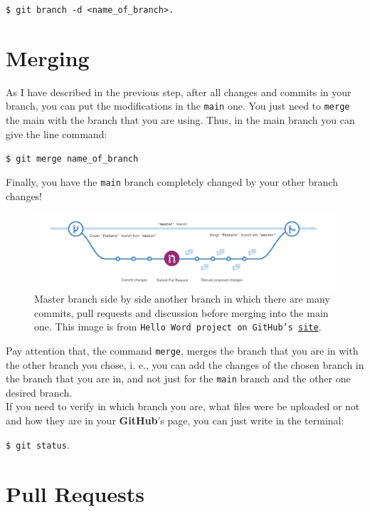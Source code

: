 \documentclass[12pt,a4paper,titlepage,brazil]{article}
\begin{document}
{\texttt{\$ git branch -d <name\_of\_branch>.}


\section{Merging}

As I have described in the previous step, after all changes and commits in your branch, you can put the modifications in the \texttt{main} one. You just need to \texttt{merge} the main with the branch that you are using. Thus, in the main branch you can give the line command:

\texttt{\$ git merge name\_of\_branch}

Finally, you have the \texttt{main} branch completely changed by your other branch changes!

\begin{figure}[h!]
 \centering 
 \includegraphics[scale=0.24]{branching.png}
 \caption{Master branch side by side another branch in which there are many commits, pull requests and discussion before merging into the main one. This image is from \texttt{Hello Word project on GitHub's \href{https://guides.github.com/activities/hello-world/branching.png}{site}}.}
\end{figure}

Pay attention that, the command \texttt{merge}, merges the branch that you are in with the other branch you chose, i. e., you can add the changes of the chosen branch in the branch that you are in, and not just for the \texttt{main} branch and the other one desired branch.\\

If you need to verify in which branch you are, what files were be uploaded or not and how they are in your {\bf GitHub}'s page, you can just write in the terminal:

\texttt{\$ git status}.


\section{Pull Requests}

}
\end{document}
